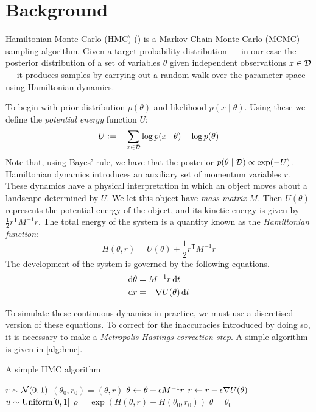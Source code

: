 
\section{Background}

Hamiltonian Monte Carlo (HMC) (\cite{duane-hmc,neal-hmc}) is a Markov Chain Monte Carlo (MCMC) sampling algorithm. Given a target probability distribution — in our case the posterior distribution of a set of variables $\theta$ given independent observations $x \in \mathcal{D}$ — it produces samples by carrying out a random walk over the parameter space using Hamiltonian dynamics.

To begin with prior distribution $p(\theta)$ and likelihood $p(x \mid \theta)$. Using these we define the \emph{potential energy} function $U$:
\begin{equation*}
    U \vcentcolon= - \sum_{x \in \mathcal{D}}\log p(x \mid \theta) - \log p(\theta)
\end{equation*}
Note that, using Bayes' rule, we have that the posterior $p(\theta \mid \mathcal{D}) \propto \exp(-U)$. Hamiltonian dynamics introduces an auxiliary set of momentum variables $r$. These dynamics have a physical interpretation in which an object moves about a landscape determined by $U$. We let this object have \emph{mass matrix} $M$. Then $U(\theta)$ represents the potential energy of the object, and its kinetic energy is given by $\frac 1 2 r^{\mathsf T} M^{-1} r$. The total energy of the system is a quantity known as the \emph{Hamiltonian function}:
\begin{equation*}
    H(\theta, r) = U(\theta) + \frac 1 2 r^{\mathsf T} M^{-1} r
\end{equation*}
The development of the system is governed by the following equations.
\begin{align*}
    \dif\theta &= M^{-1}r \dif t \\
    \dif r &= - \nabla U(\theta) \dif t
\end{align*}

To simulate these continuous dynamics in practice, we must use a discretised version of these equations. To correct for the inaccuracies introduced by doing so, it is necessary to make a \emph{Metropolis-Hastings correction step}. A simple algorithm is given in \cref{alg:hmc}.

\begin{algorithm}
    \caption{A simple HMC algorithm}\label{alg:hmc}
    \begin{algorithmic}
            \State $r \sim \mathcal N(0,1)$ 
            \State $(\theta_0, r_0) = (\theta, r)$ 
                \State $\theta \gets \theta + \epsilon M^{-1}r$
                \State $r \gets r - \epsilon \nabla U(\theta)$
            \EndFor
            \State $u \sim \rm{Uniform}[0,1]$
            \State $\rho = \exp(H(\theta, r) - H(\theta_0, r_0))$ 
             
                \State $\theta = \theta_0$
            \EndIf
        \EndFor
    \end{algorithmic}
\end{algorithm}


